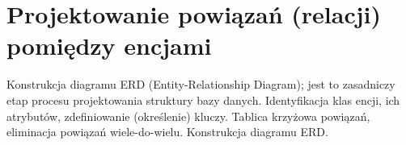 \section{Projektowanie powiązań (relacji) pomiędzy encjami}
Konstrukcja diagramu ERD
(Entity-Relationship Diagram); jest to zasadniczy etap procesu projektowania struktury
bazy danych. Identyfikacja klas encji, ich atrybutów, zdefiniowanie (określenie) kluczy.
Tablica krzyżowa powiązań, eliminacja powiązań wiele-do-wielu. Konstrukcja diagramu
ERD.